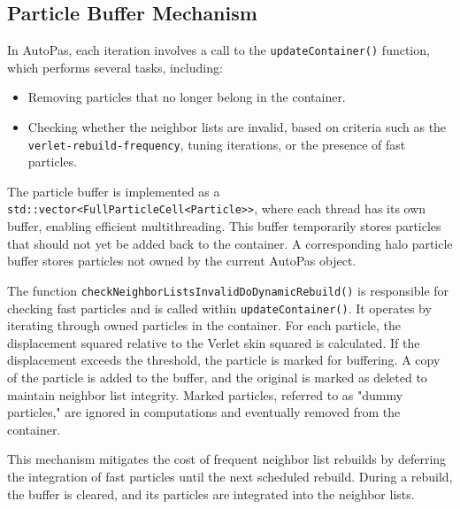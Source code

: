 \subsection{Particle Buffer Mechanism}

In AutoPas, each iteration involves a call to the 	\texttt{updateContainer()} function, which performs several tasks, including:
\begin{itemize}
    \item Removing particles that no longer belong in the container.
    \item Checking whether the neighbor lists are invalid, based on criteria such as the 	\texttt{verlet-rebuild-frequency}, tuning iterations, or the presence of fast particles.
\end{itemize}


The particle buffer is implemented as a 	\texttt{std::vector<FullParticleCell<Particle>>}, where each thread has its own buffer, enabling efficient multithreading. This buffer temporarily stores particles that should not yet be added back to the container. A corresponding halo particle buffer stores particles not owned by the current AutoPas object.

The function \texttt{checkNeighborListsInvalidDoDynamicRebuild()} is responsible for 
checking fast particles and is called within \texttt{updateContainer()}. It operates by iterating through owned particles in the container. For each particle, the displacement squared relative to the Verlet skin squared is calculated. If the displacement exceeds the threshold, the particle is marked for buffering. A copy of the particle is added to the buffer, and the original is marked as deleted to maintain neighbor list integrity. Marked particles, referred to as "dummy particles," are ignored in computations and eventually removed from the container.

This mechanism mitigates the cost of frequent neighbor list rebuilds by deferring the integration of fast particles until the next scheduled rebuild. During a rebuild, the buffer is cleared, and its particles are integrated into the neighbor lists.

